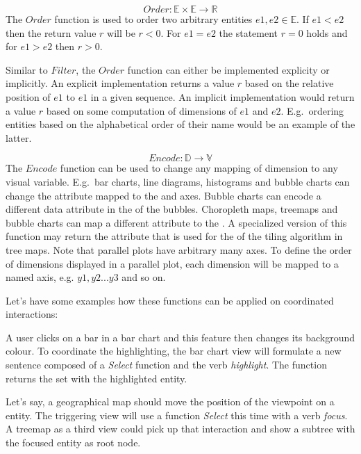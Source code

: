 \documentclass{article}
\newcommand{\attr}[1]{\texttt{\detokenize{#1}}}
\begin{document}
\begin{equation} Order: \mathbb{E} \times \mathbb{E} \rightarrow \mathbb{R} \end{equation}
  The $Order$ function is used to order two arbitrary entities $e1, e2 \in \mathbb{E}$.
  If $e1 < e2$ then the return value $r$ will be $ r < 0 $.
  For $e1 = e2$ the statement $r = 0$ holds and for $e1 > e2$ then $r > 0$.

  Similar to $Filter$, the $Order$ function can either be implemented explicity or implicitly.
  An explicit implementation returns a value $r$ based on the relative position of $e1$ to $e1$ in a given sequence.
  An implicit implementation would return a value $r$ based on some computation of dimensions of $e1$ and $e2$.
  E.g.\ ordering entities based on the alphabetical order of their name would be an example of the latter.

\begin{equation} Encode: \mathbb{D} \rightarrow \mathbb{V} \end{equation}
  The $Encode$ function can be used to change any mapping of dimension to any visual variable.
  E.g.\ bar charts, line diagrams, histograms and bubble charts can change the attribute mapped to the \attr{y} and \attr{x} axes.
  Bubble charts can encode a different data attribute in the \attr{size} of the bubbles.
  Choropleth maps, treemaps and bubble charts can map a different attribute to the \attr{colour}.
  A specialized version of this function may return the attribute that is used for the \attr{layout} of the tiling algorithm in tree maps.
  Note that parallel plots have arbitrary many \attr{y} axes.
  To define the order of dimensions displayed in a parallel plot, each dimension will be mapped to a named \attr{y} axis, e.g. $y1, y2 ... y3$ and so on.

Let's have some examples how these functions can be applied on coordinated interactions:

A user clicks on a bar in a bar chart and this feature then changes its background colour.
To coordinate the highlighting, the bar chart view will formulate a new sentence composed of a \emph{Select} function and the verb \emph{highlight}.
The function returns the set with the highlighted entity.

Let's say, a geographical map should move the position of the viewpoint on a entity.
The triggering view will use a function \emph{Select} this time with a verb \emph{focus}.
A treemap as a third view could pick up that interaction and show a subtree with the focused entity as root node. 
\end{document}
